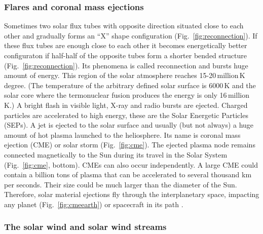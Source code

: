 \documentclass[sn-aps]{sn-jnl}%
\begin{document}
\subsubsection{Flares and coronal mass ejections}
\label{sec:cme}

Sometimes two solar flux tubes with opposite direction situated close to each other and gradually forms an ``X'' shape configuration (Fig.~\ref{fig:reconnection}). If these flux tubes are enough close to each other it becomes energetically better configuraton if half-half of the opposite tubes form a shorter bended structure (Fig.~\ref{fig:reconnection}). Its phenomena is called reconnection and bursts huge amount of energy. This region of the solar atmosphere reaches 15-20\,million\,K degree. (The temperature of the arbitrary defined solar surface is 6000\,K and the solar core where the termonuclear fusion produces the energy is only 16\,million\,K.) A bright flash in visible light, X-ray and radio bursts are ejected. Charged particles are accelerated to high energy, these are the Solar Energetic Particles (SEPs). A jet is ejected to the solar surface and usually (but not always) a huge amount of hot plasma launched to the heliosphere. Its name is coronal mass ejection (CME) or solar storm (Fig.~\ref{fig:cme}). The ejected plasma node remains connected magnetically to the Sun during its travel in the Solar System (Fig.~\ref{fig:cme}, bottom). CMEs can also occur independently. A large CME could contain a billion tons of plasma that can be accelerated to several thousand km per seconds. Their size could be much larger than the diameter of the Sun. Therefore, solar material ejections fly through the interplanetary space, impacting any planet (Fig.~\ref{fig:cmeearth}) or spacecraft in its path \cite{scherer05:_space_weath,stix04:_sun_introd}.

\subsubsection{The solar wind and solar wind streams}
\label{sec:sw}
\end{document}
